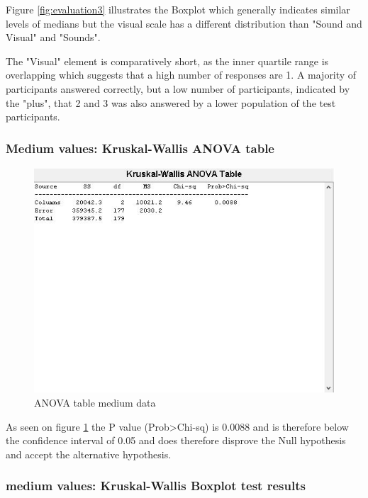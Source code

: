 Figure \ref{fig:evaluation3} illustrates the Boxplot which generally indicates similar levels of medians but the visual scale has a different distribution than "Sound and Visual" and "Sounds".

The "Visual" element is comparatively short, as the inner quartile range is overlapping which suggests that a high number of responses are 1. 
A majority of participants answered correctly, but a low number of participants, indicated by the "plus", that 2 and 3 was also answered by a lower population of the test participants.




\subsubsection*{Medium values: Kruskal-Wallis ANOVA table} %
\label{ssub:medium_values_kruskal_wallis_anova_table}

\begin{figure}[!htbp]
    \centering
    \includegraphics[width=.7\textwidth]{images/Evaluation5.jpg}
    \caption{ANOVA table medium data}
    \label{fig:evaluation2}
\end{figure}

As seen on figure \ref{fig:evaluation2} the P value (Prob>Chi-sq) is 0.0088 and is therefore below the confidence interval of 0.05 and does therefore disprove the Null hypothesis and accept the alternative hypothesis.



\FloatBarrier


\subsubsection*{medium values: Kruskal-Wallis Boxplot test results} %
\label{ssub:medium_values_kruskal_wallis_test_results}

